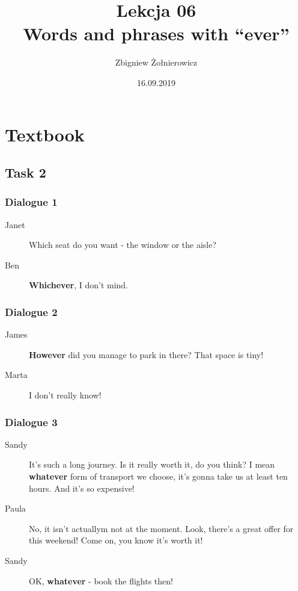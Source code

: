 \documentclass[a4paper]{article}
\begin{document}
\title{{\huge Lekcja 06} \\
{\large Words and phrases with ``ever''}}
\author{Zbigniew Żołnierowicz}
\date{16.09.2019}
\maketitle
\section*{Textbook}
\subsection*{Task 2}
\subsubsection*{Dialogue 1}
\begin{description}
    \item[Janet] Which seat do you want - the window or the aisle?
    \item[Ben] \textbf{Whichever}, I don't mind.
\end{description}
\subsubsection*{Dialogue 2}
\begin{description}
    \item[James] \textbf{However} did you manage to park in there? That space is tiny!
    \item[Marta] I don't really know!
\end{description}
\subsubsection*{Dialogue 3}
\begin{description}
    \item[Sandy] It's such a long journey. Is it really worth it, do you think? I mean \textbf{whatever} form of transport we choose, it's gonna take us at least ten hours. And it's so expensive!
    \item[Paula] No, it isn't actuallym not at the moment. Look, there's a great offer for this weekend! Come on, you know it's worth it!
    \item[Sandy] OK, \textbf{whatever} - book the flights then!
\end{description}
\end{document}
